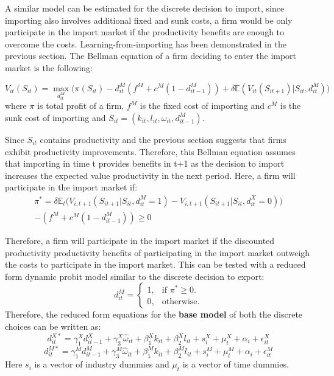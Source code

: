 \documentclass[12pt]{article}
\begin{document}
A similar model can be estimated for the discrete decision to import,
since importing also involves additional fixed and sunk costs, a firm
would be only participate in the import market if the productivity
benefits are enough to overcome the costs. Learning-from-importing has been
demonstrated in the previous section.  The Bellman equation of a firm
deciding to enter the import market is the following: 

\begin{equation}
V_{it}(S_{it})=  \underset{d_{it}^{M}}{\max}\Big(\pi(S_{it}) - d_{it}^{M}( f^{M} +
c^{M}(1-d_{it-1}^{M}))  + \delta \mathbb{E} (V_{it}(S_{it+1})|S_{it}, d_{it}^{M})\Big)
\end{equation}
where $\pi$ is total profit of a firm, $f^{M}$ is the fixed cost of
importing and  $c^{M}$ is the sunk cost of importing and  $S_{it} = (k_{it}, l_{it}, \omega_{it},
d_{it-1}^{M})$. 

Since $S_{it}$ contains productivity and the previous section suggests
that firms exhibit productivity improvements. Therefore,  this Bellman equation assumes that
importing in time t provides benefits  in t+1 as the decision to
import increases the expected value productivity in the next period. Here, a firm will participate in the
import market if:
\begin{equation}
\begin{aligned}
\pi^{*}= 
\delta \mathbb{E}_{t}\Big(V_{i,t+1}(S_{it+1}|S_{it},d_{it}^{M}=1) -
V_{i,t+1}(S_{it+1}|S_{it},d_{it}^{X}=0) \Big) \\-  
(f^{M} + c^{M}(1-d_{it-1}^{M})) \geq 0
\end{aligned}
\end{equation}

Therefore, a firm will participate in the import market if the
discounted productivity productivity benefits of participating in the
import market outweigh the costs to participate in the import
market. This can be tested with a reduced form dynamic probit model similar to
the discrete decision to export: 
\begin{equation}
  d_{it}^{M}=\begin{cases}
   1 , & \text{if $\pi^{*} \geq 0 $}.\\
   0 , & \text{otherwise}.
  \end{cases}
\end{equation}
Therefore, the reduced form equations for the \textbf{base model} of both the discrete choices
can be written as:
\begin{equation}
d_{it}^{X*} = \gamma_{1}^{X} d_{it-1}^{X} + 
\gamma_{3}^{X} \hat{\omega}_{it}  + \beta_{1}^{X}k_{it}  +\beta_{2}^{X}l_{it}+
s_{i}^{X} + \mu_{t}^{X}  + \alpha_{i}+\epsilon_{it}^{X}
\end{equation}
\begin{equation}
d_{it}^{M*} = \gamma_{1}^{M} d_{it-1}^{M} + 
\gamma_{3}^{M} \hat{\omega}_{it}  + \beta_{1}^{M}k_{it}  +\beta_{2}^{M}l_{it}+
s_{i}^{M} + \mu_{t}^{M}  + \alpha_{i}+\epsilon_{it}^{M}
\end{equation}
Here $s_{i}$ is a vector of industry dummies and $\mu_{t}$ is a vector
of time dummies. 
\end{document}
